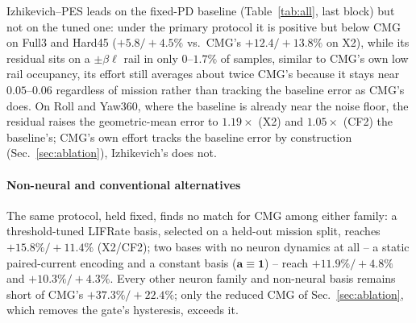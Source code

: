 \documentclass[letterpaper, 10 pt, conference]{ieeeconf}
\begin{document}
Izhikevich--PES leads on the fixed-PD baseline (Table~\ref{tab:all}, last block) but not on the tuned one: under the primary protocol it is positive but below CMG on Full3 and Hard45 ($+5.8/+4.5\%$ vs.\ CMG's $+12.4/+13.8\%$ on X2), while its residual sits on a $\pm\beta\ell$ rail in only $0$--$1.7\%$ of samples, similar to CMG's own low rail occupancy, its effort still averages about twice CMG's because it stays near $0.05$--$0.06$ regardless of mission rather than tracking the baseline error as CMG's does. On Roll and Yaw360, where the baseline is already near the noise floor, the residual raises the geometric-mean error to $1.19\times$ (X2) and $1.05\times$ (CF2) the baseline's; CMG's own effort tracks the baseline error by construction (Sec.~\ref{sec:ablation}), Izhikevich's does not.

\paragraph{Non-neural and conventional alternatives} The same protocol, held fixed, finds no match for CMG among either family: a threshold-tuned LIFRate basis, selected on a held-out mission split, reaches $+15.8\%/+11.4\%$ (X2/CF2); two bases with no neuron dynamics at all -- a static paired-current encoding and a constant basis ($\bm a\equiv\bm1$) -- reach $+11.9\%/+4.8\%$ and $+10.3\%/+4.3\%$. Every other neuron family and non-neural basis remains short of CMG's $+37.3\%/+22.4\%$; only the reduced CMG of Sec.~\ref{sec:ablation}, which removes the gate's hysteresis, exceeds it.



\end{document}

